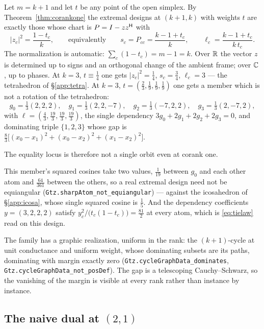 Let $m=k+1$ and let $t$ be any point of the open simplex.  By
Theorem~\ref{thm:corankone} the extremal designs at $(k+1,k)$ with weights $t$
are exactly those whose chart is $P=I-zz^{\mathsf{H}}$ with
\[
  \lvert z_c\rvert^2=\frac{1-t_c}{k},
  \qquad\text{equivalently}\qquad
  s_c=P_{cc}=\frac{k-1+t_c}{k},
  \qquad
  \ell_c=\frac{k-1+t_c}{k\,t_c} .
\]
The normalization is automatic: $\sum_c(1-t_c)=m-1=k$.  Over $\mathbb{R}$ the vector
$z$ is determined up to signs and an orthogonal change of the ambient frame;
over $\mathbb{C}$, up to phases.  At $k=3$, $t\equiv\tfrac14$ one gets
$\lvert z_c\rvert^2=\tfrac14$, $s_c=\tfrac34$, $\ell_c=3$ --- the tetrahedron of
\S\ref{app:tetra}.  At $k=3$, $t=(\tfrac23,\tfrac19,\tfrac19,\tfrac19)$ one
gets a member which is not a rotation of the tetrahedron:
\[
  g_0=\tfrac13(2,2,2),\quad
  g_1=\tfrac13(2,2,-7),\quad
  g_2=\tfrac13(-7,2,2),\quad
  g_3=\tfrac13(2,-7,2),
\]
with $\ell=(\tfrac43,\tfrac{19}3,\tfrac{19}3,\tfrac{19}3)$, the single
dependency $3g_0+2g_1+2g_2+2g_3=0$, and dominating triple $\{1,2,3\}$ whose
gap is $\tfrac83\bigl[(x_0-x_1)^2+(x_0-x_2)^2+(x_1-x_2)^2\bigr]$.

The equality locus is therefore not a single orbit even at corank one.

This member's squared cosines take two values,
$\tfrac1{19}$ between $g_0$ and each other atom and $\tfrac{64}{361}$
between the others, so a real extremal design need not be equiangular
(\texttt{Gtz.sharp\allowbreak Atom\_\allowbreak not\_\allowbreak equiangular}) --- against the icosahedron of
\S\ref{app:icosa}, whose single squared cosine is $\tfrac15$.  And the
dependency coefficients $y=(3,2,2,2)$ satisfy $y_c^2/\bigl(t_c(1-t_c)\bigr)
=\tfrac{81}2$ at every atom, which is \eqref{eq:tielaw} read on this
design.

The family has a graphic realization, uniform in the rank: the
$(k+1)$-cycle at unit conductance and uniform weight, whose dominating
subsets are its paths, dominating with margin exactly zero
(\texttt{Gtz.cycle\allowbreak Graph\allowbreak Data\_dominates},
\texttt{Gtz.cycle\allowbreak Graph\allowbreak Data\_not\_pos\allowbreak Def}).  The gap is a telescoping
Cauchy--Schwarz, so the vanishing of the margin is visible at every rank
rather than instance by instance.

\subsection{The naive dual at \texorpdfstring{$(2,1)$}{(2,1)}}\label{app:uneven}

